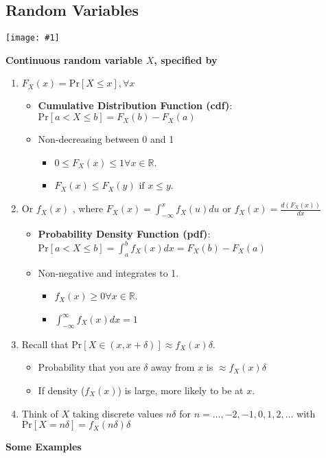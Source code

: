 \documentclass{article}
\newcommand{\R}{\mathbb R}
\newcommand{\pr}[1]{\textrm{Pr}[#1]}
\newcommand{\xs}[1]{\textrm{ #1 }}
\newcommand{\dpic}[1]{\begin{center}\texttt{[image: \#1]}\end{center}}
\newcommand{\items}[1]{\begin{itemize}#1\end{itemize}}
\newcommand{\intlim}[2]{\int_{#1}^{#2}}
\begin{document}
\subsection*{Random Variables}
\dpic{pic}
\textbf{Continuous random variable $X$, specified by}
\begin{enumerate}[1.]
	\item $F_X (x) = \pr{X \le x}, \forall x$
	\items{
		\item \textbf{Cumulative Distribution Function (cdf)}: $\pr{a < X \le b} = F_X (b)-F_X (a)$
		\item Non-decreasing between 0 and 1
		\items{
			\item $0 \le F_X (x) \le 1 \forall x \in \R$.
			\item $F_X (x) \le F_X (y) \xs{if} x \le y$.
		}
	}
	\item Or $f_X (x)$ , where $F_X (x) =\intlim{-\infty}{x}f_X (u)du$ or $f_X (x) =\frac{d(F_X (x))}{dx}$
	\items{
		\item \textbf{Probability Density Function (pdf)}: $\pr{a < X \le b} =\intlim{a}{b}f_X (x)dx = F_X (b)-F_X (a)$
		\item Non-negative and integrates to 1.
		\items{
			\item $f_X (x) \ge 0 \forall x \in \R$.
			\item $\intlim{-\infty}{\infty}f_X (x)dx = 1$
		}
	}
	\item Recall that $\pr{X \in (x,x +\delta)} \approx f_X (x)\delta$.
	\items{
		\item Probability that you are $\delta$ away from $x$ is $\approx f_X (x)\delta$
		\item If density ($f_X (x)$) is large, more likely to be at $x$.
	}
	\item Think of $X$ taking discrete values $n\delta$ for $n = \ldots,-2,-1,0,1,2,\ldots$ with $\pr{X = n\delta} = f_X (n\delta)\delta$
\end{enumerate}
\textbf{Some Examples}
\end{document}
